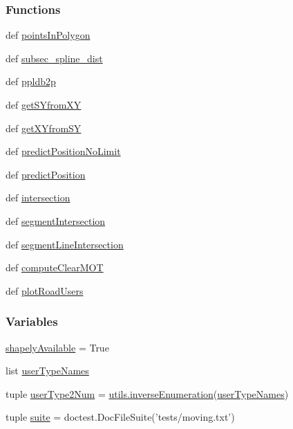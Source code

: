 \subsubsection*{Functions}
\begin{DoxyCompactItemize}
\item 
def \hyperlink{namespacemoving_a883d7b44af9ea12977c4c9628fd3bf3c}{points\-In\-Polygon}
\item 
def \hyperlink{namespacemoving_a3a0965838fd5996d465c715036807926}{subsec\-\_\-spline\-\_\-dist}
\item 
def \hyperlink{namespacemoving_a975b0d82f58b59cb5bf5506834d86de6}{ppldb2p}
\item 
def \hyperlink{namespacemoving_a23af731341e5410a2486933e582d379c}{get\-S\-Yfrom\-X\-Y}
\item 
def \hyperlink{namespacemoving_a19da896a1247ac4510351dff208e2034}{get\-X\-Yfrom\-S\-Y}
\item 
def \hyperlink{namespacemoving_a3bda96035c681aa658159b9a99af33e9}{predict\-Position\-No\-Limit}
\item 
def \hyperlink{namespacemoving_a875ec36d3b8b35d123da95d0f06213b7}{predict\-Position}
\item 
def \hyperlink{namespacemoving_a6c0c517b05f0f8b987cdc33f166b4b99}{intersection}
\item 
def \hyperlink{namespacemoving_a01222b49e079dcd6d834fd88699915a7}{segment\-Intersection}
\item 
def \hyperlink{namespacemoving_ae956eb15c0b475d2e1f004b2ae84b6b8}{segment\-Line\-Intersection}
\item 
def \hyperlink{namespacemoving_a41347e63dbd55160072635f02af57619}{compute\-Clear\-M\-O\-T}
\item 
def \hyperlink{namespacemoving_a60d2a0036bc3676c6c2bb9f2189b003e}{plot\-Road\-Users}
\end{DoxyCompactItemize}
\subsubsection*{Variables}
\begin{DoxyCompactItemize}
\item 
\hyperlink{namespacemoving_a1e5abaac58d54cc515ff42fd5d7c491d}{shapely\-Available} = True
\item 
list \hyperlink{namespacemoving_ae1d78e9bdfa7d0a07461b621aae1fd12}{user\-Type\-Names}
\item 
tuple \hyperlink{namespacemoving_a8c5c469a67b42a3e702601e7b5a3b174}{user\-Type2\-Num} = \hyperlink{namespaceutils_ad6e2839437b1cc265f6c89f24780e3de}{utils.\-inverse\-Enumeration}(\hyperlink{namespacemoving_ae1d78e9bdfa7d0a07461b621aae1fd12}{user\-Type\-Names})
\item 
tuple \hyperlink{namespacemoving_ad8b48c70544f431c19268bc377487540}{suite} = doctest.\-Doc\-File\-Suite('tests/moving.\-txt')
\end{DoxyCompactItemize}


